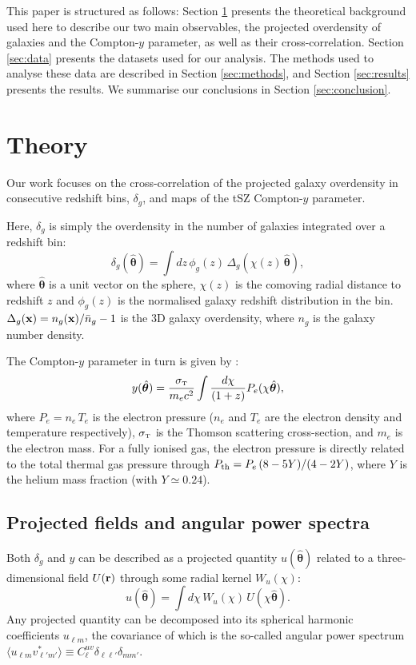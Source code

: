 \documentclass[useAMS,usenatbib]{mn2e}
\newcommand{\nv}{\hat{\boldsymbol{\theta}}}
\begin{document}
  This paper is structured as follows: Section \ref{sec:theory} presents the theoretical background used here to describe our two main observables, the projected overdensity of galaxies and the Compton-$y$ parameter, as well as their cross-correlation. Section \ref{sec:data} presents the datasets used for our analysis. The methods used to analyse these data are described in Section \ref{sec:methods}, and Section \ref{sec:results} presents the results. We summarise our conclusions in Section \ref{sec:conclusion}.


\section{Theory}\label{sec:theory}
  Our work focuses on the cross-correlation of the projected galaxy overdensity in consecutive redshift bins, $\delta_g$, and maps of the tSZ Compton-$y$ parameter.
    
  Here, $\delta_g$ is simply the overdensity in the number of galaxies integrated over a redshift bin:
  \begin{equation}
    \delta_g(\nv)=\int dz\,\phi_g(z)\,\Delta_g(\chi(z)\,\nv),
  \end{equation}
  where $\nv$ is a unit vector on the sphere, $\chi(z)$ is the comoving radial distance to redshift $z$ and $\phi_g(z)$ is the normalised galaxy redshift distribution in the bin. $\Delta_g({\bf x})=n_g({\bf x})/\bar{n}_g-1$ is the 3D galaxy overdensity, where $n_g$ is the galaxy number density.
    
  The Compton-$y$ parameter in turn is given by \citep{1972CoASP...4..173S}:
  \begin{equation}\label{eq:compty}
    y(\nv)=\frac{\sigma_{\scriptscriptstyle \rm T}}{m_ec^2}\int \frac{d\chi}{(1+z)} P_e(\chi\nv),
  \end{equation}
  where $P_e=n_e\,T_e$ is the electron pressure ($n_e$ and $T_e$ are the electron density and temperature respectively), $\sigma_{\scriptscriptstyle\rm T}$ is the Thomson scattering cross-section, and $m_e$ is the electron mass. For a fully ionised gas, the electron pressure is directly related to the total thermal gas pressure through $P_{\rm th}=P_e\,(8-5Y)/(4-2Y)$, where $Y$ is the helium mass fraction (with $Y\simeq0.24$).
    
  \subsection{Projected fields and angular power spectra}\label{ssec:theory.cls}    
    Both $\delta_g$ and $y$ can be described as a projected quantity $u(\nv)$ related to a three-dimensional field $U({\bf r})$ through some radial kernel $W_u(\chi)$:
    \begin{equation}
      u(\nv)=\int d\chi\,W_u(\chi)\,U(\chi\nv).
    \end{equation}
    Any projected quantity can be decomposed into its spherical harmonic coefficients $u_{\ell m}$, the covariance of which is the so-called angular power spectrum $\langle u_{\ell m}v^*_{\ell' m'}\rangle\equiv C^{uv}_\ell\delta_{\ell\ell'}\delta_{mm'}$.
\end{document}
